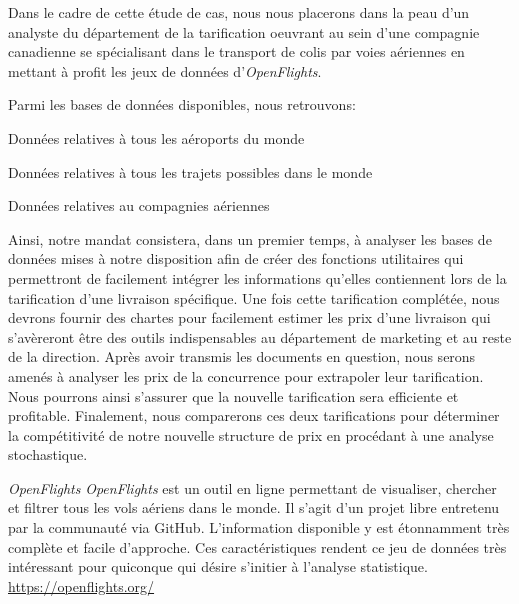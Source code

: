 Dans le cadre de cette étude de cas, nous nous placerons dans la peau d'un analyste du département de la tarification oeuvrant au sein d'une compagnie canadienne se spécialisant dans le transport de colis par voies aériennes en mettant à profit les jeux de données d'\emph{OpenFlights}. \cite{OpenFlightsData} 


Parmi les bases de données disponibles, nous retrouvons: \\

\begin{description}[style=multiline,leftmargin=2.5cm]
	\item[airports.dat] Données relatives à tous les aéroports du monde \cite{Data:RouteWorldwide}
	\item[routes.dat] Données relatives à tous les trajets possibles dans le monde \cite{Data:AirportWorldwide}
	\item[airlines.dat] Données relatives au compagnies aériennes \cite{Data:AirlineWorldWide}
\end{description}

\vspace{\baselineskip}
Ainsi, notre mandat consistera, dans un premier temps, à analyser les bases de données mises à notre disposition afin de créer des fonctions utilitaires qui permettront de facilement intégrer les informations qu'elles contiennent lors de la tarification d'une livraison spécifique. Une fois cette tarification complétée, nous devrons fournir des chartes pour facilement estimer les prix d'une livraison qui s'avèreront être des outils indispensables au département de marketing et au reste de la direction. Après avoir transmis les documents en question, nous serons amenés à analyser les prix de la concurrence pour extrapoler leur tarification. Nous pourrons ainsi s'assurer que la nouvelle tarification sera efficiente et profitable. Finalement, nous comparerons ces deux tarifications pour déterminer la compétitivité de notre nouvelle structure de prix en procédant à une analyse stochastique. \\

\begin{moreInfo}{\emph{OpenFlights}}
	\emph{OpenFlights} est un outil en ligne permettant de visualiser, chercher et filtrer tous les vols aériens dans le monde. Il s’agit d’un projet libre entretenu par la communauté via GitHub. \cite{GitHub} L’information disponible y est étonnamment très complète et facile d’approche. Ces caractéristiques rendent ce jeu de données très intéressant pour quiconque qui désire s’initier à l’analyse statistique.
	\url{https://openflights.org/}
\end{moreInfo}


